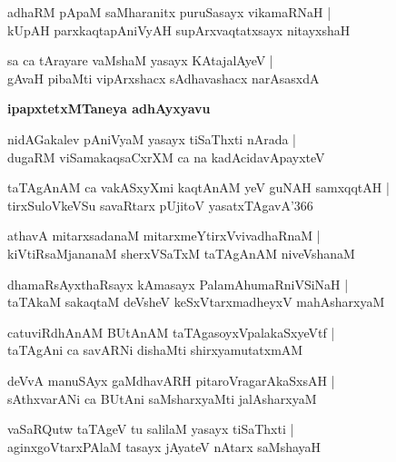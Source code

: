 \documentclass[twoside,12pt,openright]{book}
\newcounter{shloka}[chapter]
\def\uvaca#1{\centerline{{\large\textbf{#1}}}}
\begin{document}
\begin{shloka}%
adhaRM pApaM saMharanitx puruSasayx vikamaRNaH |\\
kUpAH parxkaqtapAniVyAH supArxvaqtatxsayx nitayxshaH
\end{shloka}

\begin{shloka}%
sa ca tArayare vaMshaM yasayx KAtajalAyeV |\\
gAvaH pibaMti vipArxshacx sAdhavashacx narAsasxdA
\end{shloka}

\uvaca{ ipapxtetxMTaneya adhAyxyavu }

\begin{shloka}%
nidAGakalev pAniVyaM yasayx tiSaThxti nArada |\\
dugaRM viSamakaqsaCxrXM ca na kadAcidavApayxteV
\end{shloka}

\begin{shloka}%
taTAgAnAM ca vakASxyXmi kaqtAnAM yeV guNAH samxqqtAH |\\
tirxSuloVkeVSu savaRtarx pUjitoV yasatxTAgavA\char'366
\end{shloka}

\begin{shloka}%
athavA mitarxsadanaM mitarxmeYtirxVvivadhaRnaM |\\
kiVtiRsaMjananaM sherxVSaTxM taTAgAnAM niveVshanaM 
\end{shloka}

\begin{shloka}%
dhamaRsAyxthaRsayx kAmasayx PalamAhumaRniVSiNaH |\\
taTAkaM sakaqtaM deVsheV keSxVtarxmadheyxV mahAsharxyaM 
\end{shloka}

\begin{shloka}%
catuviRdhAnAM BUtAnAM taTAgasoyxVpalakaSxyeVtf |\\
taTAgAni ca savARNi dishaMti shirxyamutatxmAM
\end{shloka}

\begin{shloka}%
deVvA manuSAyx gaMdhavARH pitaroVragarAkaSxsAH |\\
sAthxvarANi ca BUtAni saMsharxyaMti jalAsharxyaM 
\end{shloka}

\begin{shloka}%
vaSaRQutw taTAgeV tu salilaM yasayx tiSaThxti |\\
aginxgoVtarxPAlaM tasayx jAyateV nAtarx saMshayaH
\end{shloka}
\end{document}
